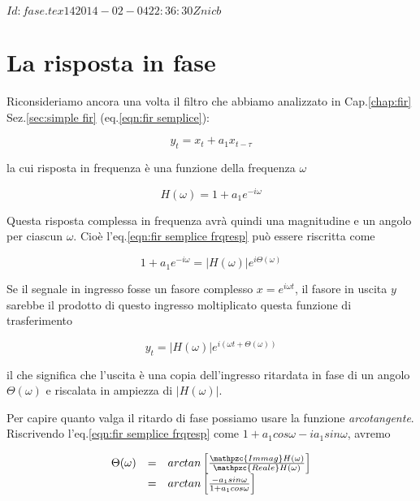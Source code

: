 %
%
%
\svnInfo $Id: fase.tex 14 2014-02-04 22:36:30Z nicb $

\section{La risposta in fase\label{sec:phase}}

Riconsideriamo ancora una volta il filtro che abbiamo analizzato in
Cap.\ref{chap:fir} Sez.\vref{sec:simple fir} (eq.\ref{eqn:fir semplice}):

		\begin{equation}\label{eqn:fir semplice 2}
						y_t = x_t + a_1 x_{t-\tau}
			\end{equation}

la cui risposta in frequenza \`e una funzione della frequenza $\omega$

	\begin{equation}\label{eqn:fir semplice frqresp}
	       H ( \omega ) = 1 + a_1 e^{-i \omega}
	\end{equation}

Questa risposta complessa in frequenza avr\`a quindi una magnitudine e un
angolo per ciascun $\omega$. Cio\`e l'eq.\ref{eqn:fir semplice frqresp} pu\`o
essere riscritta come 

	\begin{equation}\label{eqn:fir semplice frqresp 2}
	       1 + a_1 e^{-i \omega} = |H ( \omega )| e^{i \Theta ( \omega )}
	\end{equation}

Se il segnale in ingresso fosse un fasore complesso $x = e^{i \omega t}$,
il fasore in uscita $y$ sarebbe il prodotto di questo ingresso moltiplicato
questa funzione di trasferimento

	\begin{equation}\label{eqn:fs output}
		y_t = |H ( \omega )|e^{i (\omega t + \Theta ( \omega ) )}
	\end{equation}

il che significa che l'uscita \`e una copia dell'ingresso ritardata in fase di
un angolo $\Theta ( \omega )$ e riscalata in ampiezza di $| H ( \omega )|$.

Per capire quanto valga il ritardo di fase possiamo usare la funzione
\emph{arcotangente}. Riscrivendo l'eq.\ref{eqn:fir semplice frqresp} come $1 +
a_1 cos \omega - i a_1 sin \omega$, avremo

  \begin{equation}\label{eqn:risp in fase}
			\begin{array}{r c l}
							\Theta ( \omega ) & = & arctan \left [ \frac{\mathpzc{Immag} H ( \omega )}{\mathpzc{Reale} H ( \omega )} \right ]\\
							                  & = & arctan \left [ \frac{- a_1 sin \omega}{1 + a_1 cos \omega} \right ]\\
			\end{array}
	\end{equation}

